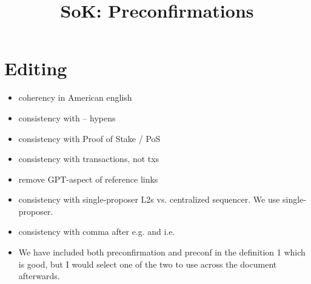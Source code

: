 \documentclass[a4paper]{article}
\theoremstyle{boldstyle}
\begin{document}
\title{SoK: Preconfirmations} 

\author{
\and
{}
\and
{}
}





\setlength{\marginparwidth}{2cm} 
\listoftodos

\section*{Editing}
\begin{itemize}
    \item coherency in American english 
    \item consistency with -- hypens
    \item consistency with Proof of Stake / PoS
    \item consistency with transactions, not txs 
    \item remove GPT-aspect of reference links
    \item consistency with single-proposer L2s vs. centralized sequencer. We use single-proposer.
    \item consistency with comma after e.g. and i.e.
    \item We have included both preconfirmation and preconf in the definition 1 which is good, but I would select one of the two to use across the document afterwards.
\end{itemize}
\end{document}
